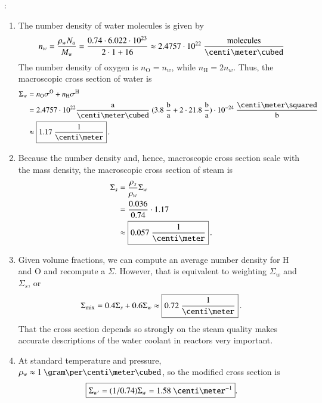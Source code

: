 \vspace{0.5cm}
\ifsolved
{
\color{purple}

:

\begin{enumerate}[label=(\alph*)]
\item The number density of water molecules is given by
\begin{equation*}
  n_{w} = \frac{\rho_w N_a}{M_w} = \frac{0.74 \cdot 6.022\cdot 10^{23}}{2\cdot 1 + 16}
   \approx 2.4757\cdot 10^{22}~\frac{\text{molecules}}{\centi\meter\cubed}
\end{equation*}
The number density of oxygen is $n_{\text{O}} = n_w$, while $n_{\text{H}} = 2n_w$.  Thus, the macroscopic cross section of water is
\begin{align*}
 \Sigma_w &= n_{\text{O}}\sigma^{\text{O}} + n_{\text{H}}\sigma^{\text{H}}\\
          &= 2.4757\cdot 10^{22} \frac{\text{a}}{\centi\meter\cubed} ~
             ( 3.8~\frac{\text{b}}{\text{a}} + 2\cdot 21.8~\frac{\text{b}}{\text{a}} )
               \cdot 10^{-24}~\frac{\text{\centi\meter\squared}}{\text{b}} \\
          &\approx \boxed{1.17~\frac{1}{\centi\meter}} \, .
\end{align*}


\item Because the number density and, hence, macroscopic cross section scale with the mass density, the macroscopic cross section of steam is
\begin{align*}
 \Sigma_s &= \frac{\rho_s}{\rho_w} \Sigma_w \\
          &= \frac{0.036}{0.74} \cdot 1.17 \\
          &\approx \boxed{0.057~\frac{1}{\centi\meter}} \, .
\end{align*}

\item  Given volume fractions, we can compute an average number density for H and O and recompute a $\Sigma$.  However, that is equivalent to weighting $\Sigma_w$ and $\Sigma_s$, or
\begin{equation*}
 \Sigma_{\text{mix}} = 0.4\Sigma_{s} + 0.6\Sigma_{w} \approx \boxed{0.72~\frac{1}{\centi\meter}} \, .
\end{equation*}
That the cross section depends so strongly on the steam quality makes accurate descriptions of the water coolant in reactors very important.

\item At standard temperature and pressure,
$\rho_w \approx 1~\gram\per\centi\meter\cubed$, so the modified cross section
is
\[
 \boxed{\Sigma_{w'}=(1/0.74)\Sigma_w
 =1.58~\centi\meter^{-1}}.
\]
\end{enumerate}


} %
\newpage
\else
\fi


